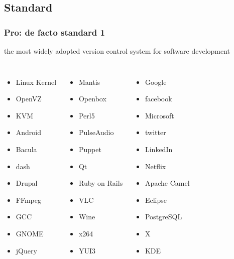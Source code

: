 \documentclass{beamer}
\begin{document}
		\subsection{Standard}

		\begin{frame}
			\frametitle{Pro: de facto standard 1}
      the most widely adopted version control system for software development
			\begin{columns}
					\begin{itemize}
					\item Linux Kernel
					\item OpenVZ
					\item KVM
					\item Android
					\item Bacula
					\item dash
					\item Drupal
					\item FFmpeg
					\item GCC
					\item GNOME
					\item jQuery
					\end{itemize}
					\begin{itemize}
					\item Mantis
					\item Openbox
					\item Perl5
					\item PulseAudio
					\item Puppet
					\item Qt
					\item Ruby on Rails
					\item VLC
					\item Wine
					\item x264
					\item YUI3
					\end{itemize}
					\begin{itemize}
					\item Google
					\item facebook
					\item Microsoft
					\item twitter
					\item LinkedIn
					\item Netflix
					\item Apache Camel
					\item Eclipse
					\item PostgreSQL
					\item X
					\item KDE
					\end{itemize}
			\end{columns}
		\end{frame}	
\end{document}
